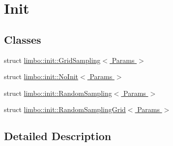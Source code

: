 \hypertarget{group__init}{}\section{Init}
\label{group__init}
\subsection*{Classes}
\begin{DoxyCompactItemize}
\item 
struct \hyperlink{structlimbo_1_1init_1_1_grid_sampling}{limbo\+::init\+::\+Grid\+Sampling$<$ Params $>$}
\item 
struct \hyperlink{structlimbo_1_1init_1_1_no_init}{limbo\+::init\+::\+No\+Init$<$ Params $>$}
\item 
struct \hyperlink{structlimbo_1_1init_1_1_random_sampling}{limbo\+::init\+::\+Random\+Sampling$<$ Params $>$}
\item 
struct \hyperlink{structlimbo_1_1init_1_1_random_sampling_grid}{limbo\+::init\+::\+Random\+Sampling\+Grid$<$ Params $>$}
\end{DoxyCompactItemize}


\subsection{Detailed Description}
